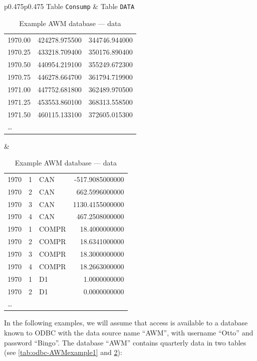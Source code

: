 \begin{table}[htbp]
  \centering
  \begin{tabular}{p{}p{}}
  Table \texttt{Consump} &
  Table \texttt{DATA} \\
    
\begin{tabular}{lll}
  1970.00	& 424278.975500	& 344746.944000 \\ 
  1970.25	& 433218.709400	& 350176.890400 \\ 
  1970.50	& 440954.219100	& 355249.672300 \\ 
  1970.75	& 446278.664700	& 361794.719900 \\ 
  1971.00	& 447752.681800	& 362489.970500 \\ 
  1971.25	& 453553.860100	& 368313.558500 \\ 
  1971.50	& 460115.133100	& 372605.015300 \\ 
\ldots \\ 
\end{tabular} &

\begin{tabular}{lllr}
1970	& 1	& CAN	& -517.9085000000\\ 
1970	& 2	& CAN	& 662.5996000000 \\ 
1970	& 3	& CAN	& 1130.4155000000\\ 
1970	& 4	& CAN	& 467.2508000000 \\ 
1970	& 1	& COMPR	& 18.4000000000  \\ 
1970	& 2	& COMPR	& 18.6341000000  \\ 
1970	& 3	& COMPR	& 18.3000000000  \\ 
1970	& 4	& COMPR	& 18.2663000000  \\ 
1970	& 1	& D1	& 1.0000000000   \\ 
1970	& 2	& D1	& 0.0000000000   \\ 
\ldots \\ 
\end{tabular}
\end{tabular}
  \caption{Example AWM database --- data}
  \label{tab:odbc-AWMexample2}
\end{table}

In the following examples, we will assume that access is available to
a database known to ODBC with the data source name ``AWM'', with
username ``Otto'' and password ``Bingo''. The database ``AWM''
contains quarterly data in two tables (see \ref{tab:odbc-AWMexample1}
and \ref{tab:odbc-AWMexample2}):

